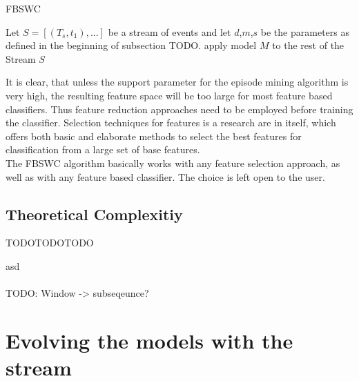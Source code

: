 \begin{algorithm}[H]
  \caption{FBSWC
    \label{alg_FBSWC}}
  \begin{algorithmic}[1]
    \Statex
    \Require Let $S=[(T_s,t_1),...]$ be a stream of events and let $d$,$m$,$s$ be the parameters as defined in the beginning of subsection TODO.
       
      	\EndFor
      	 
      \EndFor
      \State apply model $M$ to the rest of the Stream $S$
    \EndFunction
  \end{algorithmic}
\end{algorithm}

It is clear, that unless the support parameter for the episode mining algorithm is very high, the resulting feature space will be too large for most feature based classifiers. Thus feature reduction approaches need to be employed before training the classifier. Selection techniques for features is a research are in itself, which offers both basic and elaborate methods to select the best features for classification from a large set of base features. \\
The FBSWC algorithm basically works with any feature selection approach, as well as with any feature based classifier. The choice is left open to the user.

\subsection{Theoretical Complexitiy}
TODOTODOTODO

asd
\\\\
TODO: Window -> subseqeunce?


\section{Evolving the models with the stream}